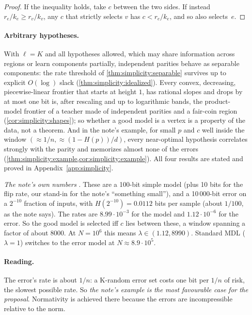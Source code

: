 \begin{proof}
If the inequality holds, take $c$ between the two sides. If instead $r_e/k_e\ge r_v/k_v$, any $c$ that strictly selects $v$ has $c<r_e/k_e$, and so also selects~$e$.
\end{proof}

\paragraph{Arbitrary hypotheses.} With $\ell=K$ and all hypotheses allowed, which may share information across regions or learn components partially, independent parities behave as separable components: the rate threshold of \cref{thm:simplicity:separable} survives up to explicit $O(\log)$ slack (\cref{thm:simplicity:idealized}). Every convex, decreasing, piecewise-linear frontier that starts at height $1$, has rational slopes and drops by at most one bit is, after rescaling and up to logarithmic bands, the product-model frontier of a teacher made of independent parities and a fair-coin region (\cref{cor:simplicity:shapes}); so whether a good model is a vertex is a property of the data, not a theorem. And in the note's example, for small $p$ and $c$ well inside the window $(\approx1/n,\approx(1-H(p))/d)$, every near-optimal hypothesis correlates strongly with the parity and memorizes almost none of the errors (\cref{thm:simplicity:example,cor:simplicity:example}). All four results are stated and proved in Appendix~\ref{app:simplicity}.

\emph{The note's own numbers} . These are a 100-bit simple model (plus 10 bits for the flip rate, our stand-in for the note's ``something small''), and a 10\,000-bit error on a $2^{-10}$ fraction of inputs, with $H(2^{-10})=0.0112$ bits per sample (about $1/100$, as the note says). The rates are $8.99\cdot10^{-3}$ for the model and $1.12\cdot10^{-6}$ for the error. So the good model is selected iff $c$ lies between these, a window spanning a factor of about 8000. At $N=10^6$ this means $\lambda\in(1.12,8990)$. Standard MDL ($\lambda=1$) switches to the error model at $N\approx8.9\cdot10^5$.

\paragraph{Reading.} The error's rate is about $1/n$: a K-random error set costs one bit per $1/n$ of risk, the slowest possible rate. So \emph{the note's example is the most favourable case for the proposal}. Normativity is achieved there because the errors are incompressible relative to the norm.

